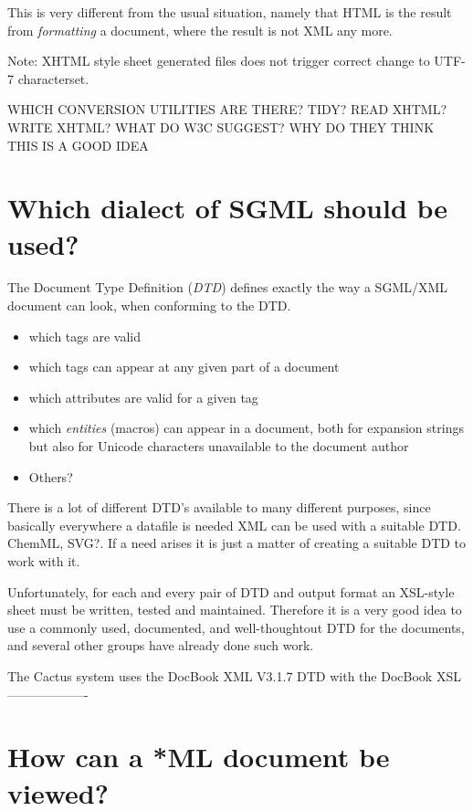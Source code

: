This is very different from the usual situation, namely that HTML is
the result from \textit{formatting} a document, where the result is
not XML any more.


\textsf{Note: XHTML style sheet generated files does not trigger
  correct change to UTF-7 characterset.}

\textsf{WHICH CONVERSION UTILITIES ARE THERE?  TIDY?  READ XHTML?
  WRITE XHTML?  WHAT DO W3C SUGGEST?  WHY DO THEY THINK THIS IS A GOOD
  IDEA}

\section{Which dialect of SGML should be used?}

The Document Type Definition (\emph{DTD}) defines exactly the way a
SGML/XML document can look, when conforming to the DTD.

\begin{itemize}
\item which tags are valid
\item which tags can appear at any given part of a document
\item which attributes are valid for a given tag
\item which \emph{entities} (macros) can appear in a document, both
  for expansion strings but also for Unicode characters unavailable to
  the document author
  
\item \textsf{Others?}
\end{itemize}

There is a lot of different DTD's available to many different
purposes, since basically everywhere a datafile is needed XML can be
used with a suitable DTD.   \textsf{ChemML}, \textsf{SVG?}.  If a need
arises it is just a matter of creating a suitable DTD to work with it.

Unfortunately, for each and every pair of DTD and output format an
XSL-style sheet must be written, tested and maintained.  Therefore it
is a very good idea to use a commonly used, documented, and
well-thoughtout DTD for the documents, and several other groups have
already done such work. 


The Cactus system uses the DocBook XML V3.1.7 DTD with the
DocBook XSL \textsf{-------------------}

\section{How can a *ML document be viewed?}

